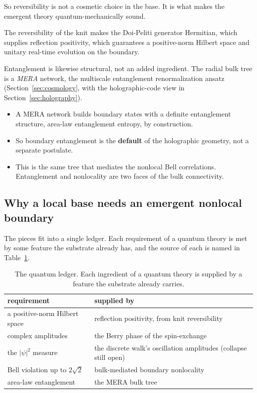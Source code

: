 So reversibility is not a cosmetic choice in the base. It is what makes the emergent theory quantum-mechanically sound.

\begin{lemma}
The reversibility of the knit makes the Doi-Peliti generator Hermitian, which supplies reflection positivity, which guarantees a positive-norm Hilbert space and unitary real-time evolution on the boundary.
\end{lemma}

Entanglement is likewise structural, not an added ingredient. The radial bulk tree is a \emph{MERA} network, the multiscale entanglement renormalization ansatz (Section~\ref{sec:cosmology}, with the holographic-code view in Section~\ref{sec:holography}).

\begin{itemize}
\item A MERA network builds boundary states with a definite entanglement structure, area-law entanglement entropy, by construction.
\item So boundary entanglement is the \textbf{default} of the holographic geometry, not a separate postulate.
\item This is the same tree that mediates the nonlocal Bell correlations. Entanglement and nonlocality are two faces of the bulk connectivity.
\end{itemize}

\subsection{Why a local base needs an emergent nonlocal boundary}

The pieces fit into a single ledger. Each requirement of a quantum theory is met by some feature the substrate already has, and the source of each is named in Table~\ref{tab:quantum-ledger}.

\begin{table}[ht]
\centering
\begin{tabular}{@{}ll@{}}
\toprule
requirement & supplied by \\
\midrule
a positive-norm Hilbert space & reflection positivity, from knit reversibility \\
complex amplitudes & the Berry phase of the spin-exchange \\
the $|\psi|^2$ measure & the discrete walk's oscillation amplitudes (collapse still open) \\
Bell violation up to $2\sqrt{2}$ & bulk-mediated boundary nonlocality \\
area-law entanglement & the MERA bulk tree \\
\bottomrule
\end{tabular}
\caption{The quantum ledger. Each ingredient of a quantum theory is supplied by a feature the substrate already carries.}
\label{tab:quantum-ledger}
\end{table}

